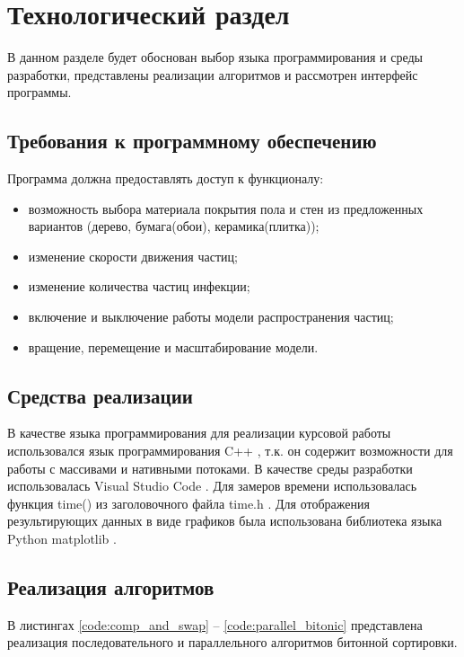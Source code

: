 \chapter{Технологический раздел}
\label{cha:impl}

В данном разделе будет обоснован выбор языка программирования и среды разработки, представлены реализации алгоритмов и рассмотрен интерфейс программы.

\section{Требования к программному обеспечению}

Программа должна предоставлять доступ к функционалу:

\begin{itemize}
	\item возможность выбора материала покрытия пола и стен из предложенных вариантов (дерево, бумага(обои), керамика(плитка));
	\item изменение скорости движения частиц;
	\item изменение количества частиц инфекции;
	\item включение и выключение работы модели распространения частиц;
	\item вращение, перемещение и масштабирование модели.
\end{itemize}

\section{Средства реализации}

В качестве языка программирования для реализации курсовой работы использовался язык программирования C++ \cite{cplusplus}, т.к. он содержит возможности для работы с массивами и нативными потоками. В качестве среды разработки использовалась Visual Studio Code \cite{vscode}. Для замеров времени  использовалась функция time() из заголовочного файла time.h \cite{cplusplus}. Для отображения результирующих данных в виде графиков была использована библиотека языка Python matplotlib \cite{matplotlib}.

\section{Реализация алгоритмов}

В листингах \ref{code:comp_and_swap} -- \ref{code:parallel_bitonic} представлена реализация последовательного и параллельного алгоритмов битонной сортировки.

